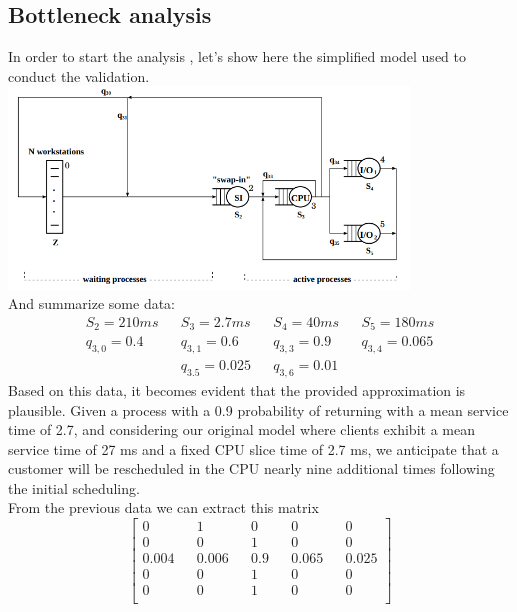 \documentclass[12pt,a4paper]{article}
\begin{document}
\subsection{Bottleneck analysis}
In order to start the analysis , let's show here the simplified model
used to conduct the validation.
\includegraphics[width=0.8\textwidth]{Images/simplified_model.png}
\\And summarize some data:
\begin{displaymath}
    \begin{aligned}
        S_2 = 210ms  &  & S_3= 2.7ms     &  & S_4 = 40ms    &  & S_5=180ms      \\
        q_{3,0}= 0.4 &  & q_{3,1}=0.6    &  & q_{3,3} = 0.9 &  & q_{3,4}= 0.065 \\
                     &  & q_{3.5}= 0.025 &  & q_{3,6}=0.01  &  &
    \end{aligned}
\end{displaymath}
Based on this data, it becomes evident that the provided approximation is plausible. Given a process with a 0.9 probability of returning with a mean service time of 2.7, and considering our original model where clients exhibit a mean service time of 27 ms and a fixed CPU slice time of 2.7 ms, we anticipate that a customer will be rescheduled in the CPU nearly nine additional times following the initial scheduling. \\

From the previous data we can extract this matrix
\begin{displaymath}
    \begin{bmatrix}
        0     &  & 1     &  & 0   &  & 0     &  & 0     \\
        0     &  & 0     &  & 1   &  & 0     &  & 0     \\
        0.004 &  & 0.006 &  & 0.9 &  & 0.065 &  & 0.025 \\
        0     &  & 0     &  & 1   &  & 0     &  & 0     \\
        0     &  & 0     &  & 1   &  & 0     &  & 0     \\
    \end{bmatrix}
\end{displaymath}
\end{document}
